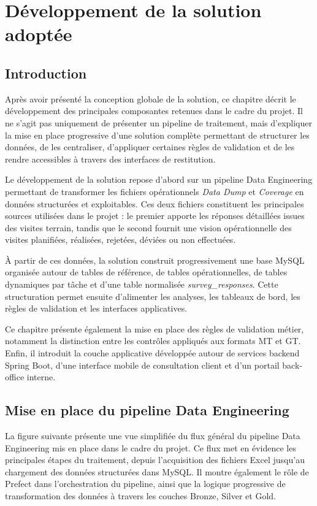 \chapter{Développement de la solution adoptée}

\section{Introduction}

Après avoir présenté la conception globale de la solution, ce chapitre décrit le développement des principales composantes retenues dans le cadre du projet. Il ne s’agit pas uniquement de présenter un pipeline de traitement, mais d’expliquer la mise en place progressive d’une solution complète permettant de structurer les données, de les centraliser, d’appliquer certaines règles de validation et de les rendre accessibles à travers des interfaces de restitution.

Le développement de la solution repose d’abord sur un pipeline Data Engineering permettant de transformer les fichiers opérationnels \textit{Data Dump} et \textit{Coverage} en données structurées et exploitables. Ces deux fichiers constituent les principales sources utilisées dans le projet : le premier apporte les réponses détaillées issues des visites terrain, tandis que le second fournit une vision opérationnelle des visites planifiées, réalisées, rejetées, déviées ou non effectuées.

À partir de ces données, la solution construit progressivement une base MySQL organisée autour de tables de référence, de tables opérationnelles, de tables dynamiques par tâche et d’une table normalisée \textit{survey\_responses}. Cette structuration permet ensuite d’alimenter les analyses, les tableaux de bord, les règles de validation et les interfaces applicatives.

Ce chapitre présente également la mise en place des règles de validation métier, notamment la distinction entre les contrôles appliqués aux formats MT et GT. Enfin, il introduit la couche applicative développée autour de services backend Spring Boot, d’une interface mobile de consultation client et d’un portail back-office interne.

\section{Mise en place du pipeline Data Engineering}

La figure suivante présente une vue simplifiée du flux général du pipeline Data Engineering mis en place dans le cadre du projet. Ce flux met en évidence les principales étapes du traitement, depuis l’acquisition des fichiers Excel jusqu’au chargement des données structurées dans MySQL. Il montre également le rôle de Prefect dans l’orchestration du pipeline, ainsi que la logique progressive de transformation des données à travers les couches Bronze, Silver et Gold.

